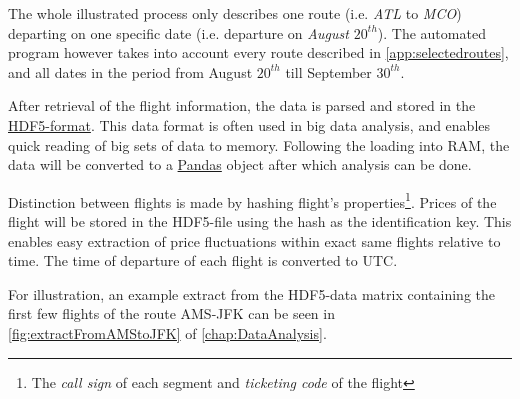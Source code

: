The whole illustrated process only describes one route (i.e. \emph{ATL} to \emph{MCO}) departing on one specific date (i.e. departure on \emph{August $20^{th}$}). The automated program however takes into account every route described in \autoref{app:selectedroutes}, and all dates in the period from August $20^{th}$ till September $30^{th}$.

After retrieval of the flight information, the data is parsed and stored in the \href{http://www.hdfgroup.org/HDF5/}{HDF5-format}. This data format is often used in big data analysis, and enables quick reading of big sets of data to memory. Following the loading into RAM, the data will be converted to a \href{http://pandas.pydata.org/}{Pandas} object after which analysis can be done.

Distinction between flights is made by hashing flight's  properties\footnote{The \emph{call sign} of each segment and \emph{ticketing code} of the flight}. Prices of the flight will be stored in the HDF5-file using the hash as the identification key. This enables easy extraction of price fluctuations within exact same flights relative to time. The time of departure of each flight is converted to UTC.

For illustration, an example extract from the HDF5-data matrix containing the first few flights of the route AMS-JFK can be seen in \autoref{fig:extractFromAMStoJFK} of \autoref{chap:DataAnalysis}.


